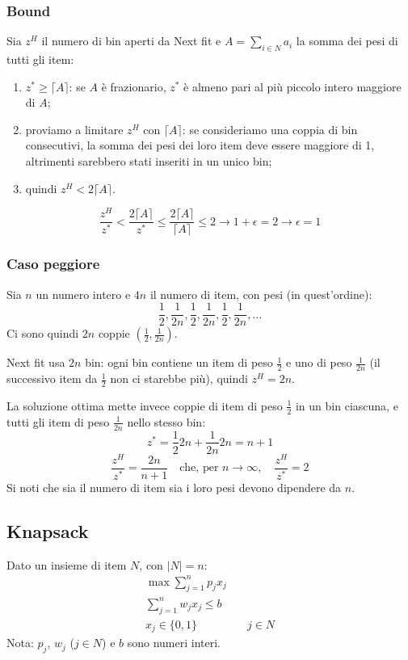 \subsubsection*{Bound}
Sia $z^H$ il numero di bin aperti da Next fit e $A=\sum_{i\in N}a_i$ la somma dei pesi di tutti gli item:
\begin{enumerate}
	\item $z^*\ge \lceil A \rceil$: se $A$ è frazionario, $z^*$ è almeno pari al più piccolo intero maggiore di $A$;
	\item proviamo a limitare $z^H$ con $\lceil A \rceil$: se consideriamo una coppia di bin consecutivi, la somma dei pesi dei loro item deve essere maggiore di 1, altrimenti sarebbero stati inseriti in un unico bin;
	\item quindi $z^H<2\lceil A\rceil$.
\end{enumerate}
\begin{equation*}
	\frac{z^H}{z^*}<\frac{2\lceil A\rceil}{z^*}\le \frac{2\lceil A\rceil}{\lceil A\rceil}\le 2\rightarrow 1+\epsilon=2\rightarrow \epsilon=1
\end{equation*}

\subsubsection*{Caso peggiore}
Sia $n$ un numero intero e $4n$ il numero di item, con pesi (in quest'ordine):
\begin{equation*}
	\frac{1}{2},\frac{1}{2n},\frac{1}{2},\frac{1}{2n},\frac{1}{2},\frac{1}{2n},\dots
\end{equation*}
Ci sono quindi $2n$ coppie $\left(\frac{1}{2},\frac{1}{2n}\right)$.

Next fit usa $2n$ bin: ogni bin contiene un item di peso $\frac{1}{2}$ e uno di peso $\frac{1}{2n}$ (il successivo item da $\frac{1}{2}$ non ci starebbe più), quindi $z^H=2n$.

La soluzione ottima mette invece coppie di item di peso $\frac{1}{2}$ in un bin ciascuna, e tutti gli item di peso $\frac{1}{2n}$ nello stesso bin:
\begin{equation*}
	z^*=\frac{1}{2}2n+\frac{1}{2n}2n=n+1
\end{equation*}
\begin{equation*}
	\frac{z^H}{z^*}=\frac{2n}{n+1}\quad \textrm{che, per } n\to \infty, \quad \frac{z^H}{z^*}=2
\end{equation*}
Si noti che sia il numero di item sia i loro pesi devono dipendere da $n$.

\subsection{Knapsack}
Dato un insieme di item $N$, con $|N|=n$:
\begin{equation*}
	\begin{aligned}
		\max \sum_{j=1}^np_jx_j\\
		\sum_{j=1}^nw_jx_j\le b\\
		x_j\in \{0,1\} \quad & \quad j\in N
	\end{aligned}
\end{equation*}
Nota: $p_j$, $w_j$ ($j\in N$) e $b$ sono numeri interi.

